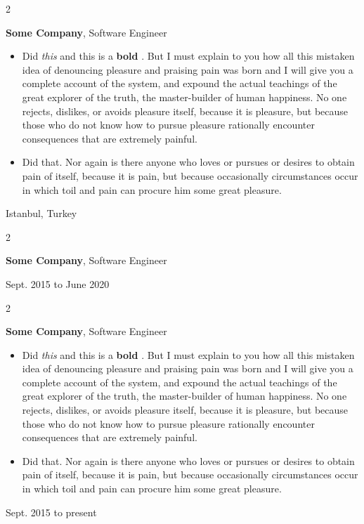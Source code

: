 \documentclass[10pt, letterpaper]{article}
\newenvironment{highlights}{
    \begin{itemize}[
        topsep=0.10 cm,
        parsep=0.10 cm,
        partopsep=0pt,
        itemsep=0pt,
        leftmargin=0.4 cm + 10pt
    ]
}{
    \end{itemize}
} %
\newenvironment{twocolentry}[2][]{
    \onecolentry
    \def\secondColumn{#2}
    \setcolumnwidth{\fill, 4.5 cm}
    \begin{paracol}{2}
}{
    \switchcolumn \raggedleft \secondColumn
    \end{paracol}
    \endonecolentry
} %
\let\hrefWithoutArrow\href
\renewcommand{\href}[2]{\hrefWithoutArrow{#1}{\mbox{\ifthenelse{\equal{#2}{}}{ }{#2 }\raisebox{.15ex}{\footnotesize \faExternalLink*}}}}
\begin{document}
        \begin{twocolentry}{
            Istanbul, Turkey
        }
            \textbf{Some \textnormal{Company}}, Software Engineer
            \begin{highlights}
                \item Did \textit{this} and this is a \textbf{bold} \href{https://example.com}{link}. But I must explain to you how all this mistaken idea of denouncing pleasure and praising pain was born and I will give you a complete account of the system, and expound the actual teachings of the great explorer of the truth, the master-builder of human happiness. No one rejects, dislikes, or avoids pleasure itself, because it is pleasure, but because those who do not know how to pursue pleasure rationally encounter consequences that are extremely painful.
                \item Did that. Nor again is there anyone who loves or pursues or desires to obtain pain of itself, because it is pain, but because occasionally circumstances occur in which toil and pain can procure him some great pleasure.
            \end{highlights}
        \end{twocolentry}


        \vspace{0.2 cm}

        \begin{twocolentry}{
            Sept. 2015 to June 2020
        }
            \textbf{Some \textnormal{Company}}, Software Engineer
        \end{twocolentry}


        \vspace{0.2 cm}

        \begin{twocolentry}{
            Sept. 2015 to present
        }
            \textbf{Some \textnormal{Company}}, Software Engineer
            \begin{highlights}
                \item Did \textit{this} and this is a \textbf{bold} \href{https://example.com}{link}. But I must explain to you how all this mistaken idea of denouncing pleasure and praising pain was born and I will give you a complete account of the system, and expound the actual teachings of the great explorer of the truth, the master-builder of human happiness. No one rejects, dislikes, or avoids pleasure itself, because it is pleasure, but because those who do not know how to pursue pleasure rationally encounter consequences that are extremely painful.
                \item Did that. Nor again is there anyone who loves or pursues or desires to obtain pain of itself, because it is pain, but because occasionally circumstances occur in which toil and pain can procure him some great pleasure.
            \end{highlights}
        \end{twocolentry}
\end{document}
